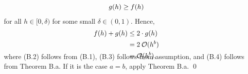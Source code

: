 \documentclass[11pt]{article}
\theoremstyle{break}
\numberwithin{equation}{theorem}
\begin{document}
\begin{enumerate}
    \begin{equation}
        g(h)\geq f(h) \vspace{-0.6em}
    \end{equation}
    for all $h\in[0 ,\delta)$ for some small $\delta\in(0, 1)$. Hence, \vspace{-0.6em}
    \begin{align}
        f(h)+g(h)&\leq 2\cdot g(h)\\
        &=2\:\mathcal{O}(h^b)\\
        &=\mathcal{O}(h^b),\\[-3.4em]\notag
    \end{align}
    where (B.2) follows from (B.1), (B.3) follows from assumption, and (B.4) follows from Theorem B.a. If it is the case $a=b$, apply Theorem B.a. \qed
\end{enumerate}
\end{document}
